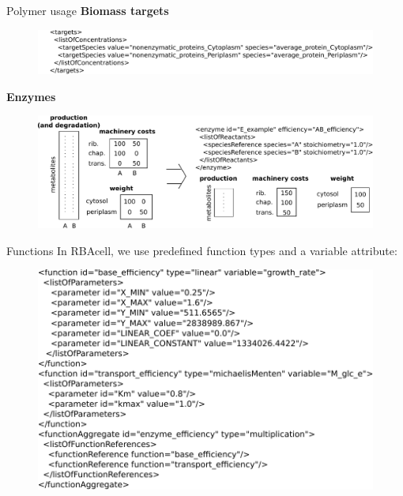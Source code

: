 \documentclass{beamer}
\begin{document}
\begin{frame}{Polymer usage}
  \textbf{Biomass targets}
  \begin{figure}
    \centering
    \includegraphics[width=\linewidth]{targets}
  \end{figure}
  \textbf{Enzymes}
  \begin{figure}
    \centering
    \includegraphics[width=\linewidth]{enzyme}
  \end{figure}
\end{frame}

\begin{frame}{Functions}
  In RBAcell, we use predefined function types and a variable attribute:
  \begin{figure}
    \centering
    \includegraphics[width=\linewidth]{functions}
  \end{figure}
\end{frame}
\end{document}
